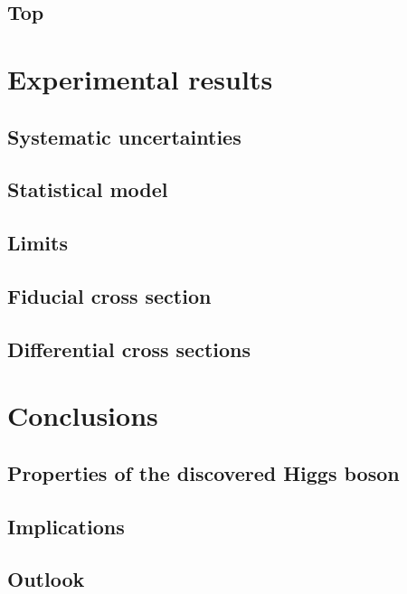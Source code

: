 \documentclass[hyper,linkcolor=blue]{mythesis}
\begin{document}
\begin{mainmatter}
    \section{Top}
      \label{sec:top}
      
    \section{\DY}
      \label{sec:dy}
      

  \chapter{Experimental results}
    \label{chap:results}
    
    \section{Systematic uncertainties}
      \label{sec:systematics}
      
    \section{Statistical model}
    \section{Limits}
    \section{Fiducial cross section}
      \label{sec:fiducial}
      
    \section{Differential cross sections}
      \label{sec:unfolding}
      

  \chapter{Conclusions}
    \label{chap:conclusions}
    
    \section{Properties of the discovered Higgs boson}
      \label{sec:searches}
      
    \section{Implications}
      \label{sec:implications}
      
    \section{Outlook}
      \label{sec:outlook}
      
\end{mainmatter}
\end{document}
